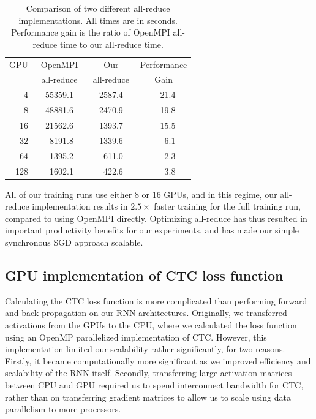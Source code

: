 \begin{table}
\centering
\begin{tabular}{r  r r r  r r r  r r r}
\toprule
GPU & \multicolumn{3}{c}{OpenMPI} & \multicolumn{3}{c}{Our} & \multicolumn{3}{c}{Performance} \\
    & \multicolumn{3}{c}{all-reduce} & \multicolumn{3}{c}{all-reduce} & \multicolumn{3}{c}{Gain}        \\
\midrule
4   & & 55359.1 & & & 2587.4 & & & 21.4 &  \\
8   & & 48881.6 & & & 2470.9 & & & 19.8 &  \\
16  & & 21562.6 & & & 1393.7 & & & 15.5 &  \\
32  & & 8191.8  & & & 1339.6 & & & 6.1  &  \\
64  & & 1395.2  & & & 611.0  & & & 2.3  &  \\
128 & & 1602.1  & & & 422.6  & & & 3.8  &  \\
\bottomrule
\end{tabular}
\caption{Comparison of two different all-reduce implementations. All times are
         in seconds. Performance gain is the ratio of OpenMPI all-reduce time to our
         all-reduce time.}
\label{table:deepspeech2:allreduce}
\end{table}

All of our training runs use either 8 or 16 GPUs, and in this regime, our
all-reduce implementation results in $2.5\times$ faster training for the full
training run, compared to using OpenMPI directly. Optimizing all-reduce has
thus resulted in important productivity benefits for our experiments, and has
made our simple synchronous SGD approach scalable.

\subsection{GPU implementation of CTC loss function}

Calculating the CTC loss function is more complicated than performing forward
and back propagation on our RNN architectures. Originally, we transferred
activations from the GPUs to the CPU, where we calculated the loss function
using an OpenMP parallelized implementation of CTC. However, this
implementation limited our scalability rather significantly, for two reasons.
Firstly, it became computationally more significant as we improved efficiency
and scalability of the RNN itself. Secondly, transferring large activation
matrices between CPU and GPU required us to spend interconnect bandwidth for
CTC, rather than on transferring gradient matrices to allow us to scale using
data parallelism to more processors.

